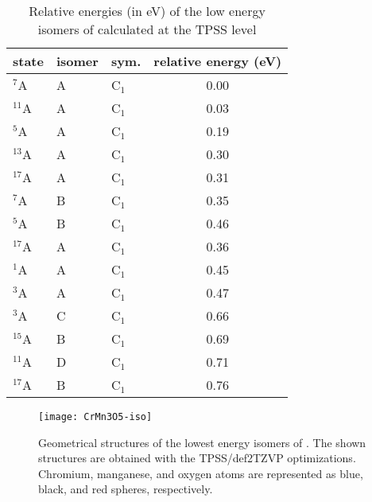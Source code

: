 \begin{table}[]
	\centering
	\caption{Relative energies (in eV) of the low energy isomers of  calculated at the TPSS level}
	\begin{tabular}{@{}lllc@{}}
	\toprule
	state & isomer & sym. & relative energy (eV) \\ \midrule
	$^7$A      & A      & C$_1$   & 0.00                 \\
	$^{11}$A   & A      & C$_1$   & 0.03                 \\
	$^5$A      & A      & C$_1$   & 0.19                 \\
	$^{13}$A   & A      & C$_1$   & 0.30                 \\
	$^{17}$A   & A      & C$_1$   & 0.31                 \\
	$^7$A      & B      & C$_1$   & 0.35                 \\
	$^5$A      & B      & C$_1$   & 0.46                 \\
	$^{17}$A   & A      & C$_1$   & 0.36                 \\
	$^1$A      & A      & C$_1$   & 0.45                 \\
	$^3$A      & A      & C$_1$   & 0.47                 \\
	$^3$A      & C      & C$_1$   & 0.66                 \\
	$^{15}$A   & B      & C$_1$   & 0.69                 \\
	$^{11}$A   & D      & C$_1$   & 0.71                 \\
	$^{17}$A   & B      & C$_1$   & 0.76                 \\ \bottomrule
	\end{tabular}
\end{table}



\begin{figure}
	\centering
	\texttt{[image: CrMn3O5-iso]}
	\caption{Geometrical structures of the lowest energy isomers of . The shown structures are obtained with the TPSS/def2TZVP optimizations. Chromium, manganese, and oxygen atoms are represented as blue, black, and red spheres, respectively.}
	\label{figs:CrMn3O5}
\end{figure}






\FloatBarrier



